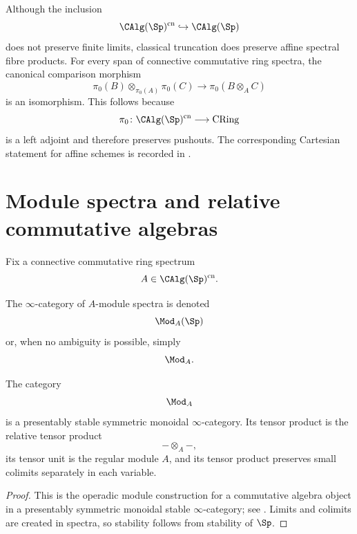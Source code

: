 \begin{remark}
\label{rem:classical-truncation-not-left-exact}
Although the inclusion
\[
    \CAlg(\Sp)^{\mathrm{cn}}
    \hookrightarrow
    \CAlg(\Sp)
\]
does not preserve finite limits, classical truncation does preserve
affine spectral fibre products. For every span of connective commutative
ring spectra, the canonical comparison morphism
\[
    \pi_0(B)
    \otimes_{\pi_0(A)}
    \pi_0(C)
    \longrightarrow
    \pi_0(B\otimes_A C)
\]
is an isomorphism. This follows because
\[
    \pi_0
    \colon
    \CAlg(\Sp)^{\mathrm{cn}}
    \longrightarrow
    \operatorname{CRing}
\]
is a left adjoint and therefore preserves pushouts. The corresponding
Cartesian statement for affine schemes is recorded in
.
\end{remark}

\section{Module spectra and relative commutative algebras}
\label{sec:module-spectra-relative-algebras}

Fix a connective commutative ring spectrum
\[
    A\in\CAlg(\Sp)^{\mathrm{cn}}.
\]

\begin{definition}
\label{def:module-spectrum-over-a}
The $\infty$-category of $A$-module spectra is denoted
\[
    \Mod_A(\Sp)
\]
or, when no ambiguity is possible, simply
\[
    \Mod_A.
\]
\end{definition}

\begin{theorem}
\label{thm:spectral-module-category}
The category
\[
    \Mod_A
\]
is a presentably stable symmetric monoidal $\infty$-category. Its tensor
product is the relative tensor product
\[
    -\otimes_A-,
\]
its tensor unit is the regular module $A$, and its tensor product preserves
small colimits separately in each variable.
\end{theorem}

\begin{proof}
This is the operadic module construction for a commutative algebra object
in a presentably symmetric monoidal stable $\infty$-category; see
\cite[Theorem~4.5.2.1]{LurieHigherAlgebra}. Limits and colimits are created
in spectra, so stability follows from stability of $\Sp$.
\end{proof}

